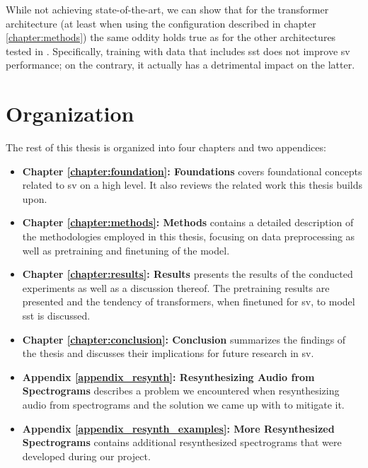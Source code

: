 While not achieving state-of-the-art, we can show that for the transformer architecture (at least when using the configuration described in chapter \ref{chapter:methods}) the same oddity holds true as for the other architectures tested in \cite{neururer2023deep}. Specifically, training with data that includes \gls{sst} does not improve \gls{sv} performance; on the contrary, it actually has a detrimental impact on the latter.


\section{Organization}\label{sec:organization}

The rest of this thesis is organized into four chapters and two appendices:

\begin{itemize}
    \item \textbf{Chapter \ref{chapter:foundation}: Foundations} covers foundational concepts related to \gls{sv} on a high level. It also reviews the related work this thesis builds upon.
    \item \textbf{Chapter \ref{chapter:methods}: Methods} contains a detailed description of the methodologies employed in this thesis, focusing on data preprocessing as well as pretraining and finetuning of the model.
    \item \textbf{Chapter \ref{chapter:results}: Results} presents the results of the conducted experiments as well as a discussion thereof. The pretraining results are presented and the tendency of transformers, when finetuned for \gls{sv}, to model \gls{sst} is discussed.
    \item \textbf{Chapter \ref{chapter:conclusion}: Conclusion} summarizes the findings of the thesis and discusses their implications for future research in \gls{sv}.
    \item \textbf{Appendix \ref{appendix_resynth}: Resynthesizing Audio from Spectrograms} describes a problem we encountered when resynthesizing audio from spectrograms and the solution we came up with to mitigate it.
    \item \textbf{Appendix \ref{appendix_resynth_examples}: More Resynthesized Spectrograms} contains additional resynthesized spectrograms that were developed during our project.
\end{itemize}
\pagebreak [3]


